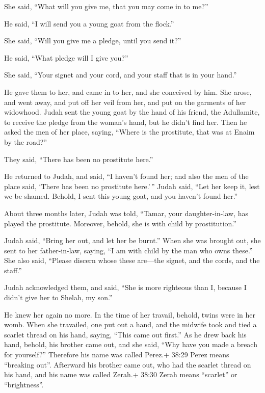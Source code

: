 She said, ``What will you give me, that you may come in to me?''

 He said, ``I will send you a young goat from the flock.''

She said, ``Will you give me a pledge, until you send it?''

 He said, ``What pledge will I give you?''

She said, ``Your signet and your cord, and your staff that is in your
hand.''

He gave them to her, and came in to her, and she conceived by him.
 She arose, and went away, and put off her veil from her,
and put on the garments of her widowhood.  Judah sent the
young goat by the hand of his friend, the Adullamite, to receive the
pledge from the woman's hand, but he didn't find her.  Then
he asked the men of her place, saying, ``Where is the prostitute, that
was at Enaim by the road?''

They said, ``There has been no prostitute here.''

 He returned to Judah, and said, ``I haven't found her; and
also the men of the place said, `There has been no prostitute here.'\,''
 Judah said, ``Let her keep it, lest we be shamed. Behold,
I sent this young goat, and you haven't found her.''

 About three months later, Judah was told, ``Tamar, your
daughter-in-law, has played the prostitute. Moreover, behold, she is
with child by prostitution.''

Judah said, ``Bring her out, and let her be burnt.''  When
she was brought out, she sent to her father-in-law, saying, ``I am with
child by the man who owns these.'' She also said, ``Please discern whose
these are---the signet, and the cords, and the staff.''

 Judah acknowledged them, and said, ``She is more righteous
than I, because I didn't give her to Shelah, my son.''

He knew her again no more.  In the time of her travail,
behold, twins were in her womb.  When she travailed, one
put out a hand, and the midwife took and tied a scarlet thread on his
hand, saying, ``This came out first.''  As he drew back his
hand, behold, his brother came out, and she said, ``Why have you made a
breach for yourself?'' Therefore his name was called Perez.+ 38:29 Perez
means ``breaking out''.  Afterward his brother came out,
who had the scarlet thread on his hand, and his name was called Zerah.+
38:30 Zerah means ``scarlet'' or ``brightness''.

